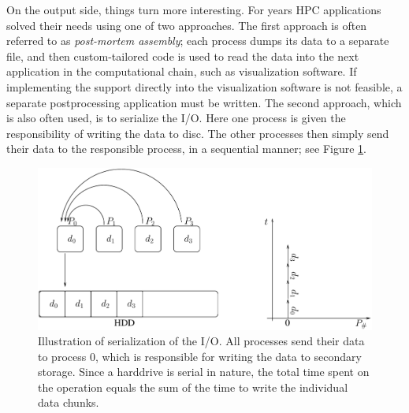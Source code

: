 \documentclass[twoside, 11pt, a4paper]{article}
\begin{document}
On the output side, things turn more interesting. For years HPC applications solved 
their needs using one of two approaches. The first approach is often referred to as
\emph{post-mortem assembly}; each process dumps its data to a separate file, and 
then custom-tailored code is used to read the data into the next application in the
computational chain, such as visualization software. If implementing the support directly
into the visualization software is not feasible, a separate postprocessing 
application must be written. The second approach, which is also often used, is to 
serialize the I/O. Here one process is given the responsibility of writing the data 
to disc. The other processes then simply send their data to the responsible process, 
in a sequential manner; see Figure \ref{fig:serial}.

\begin{figure}[ht]
	\begin{center}
		\includegraphics[width=12cm]{serial}
	\end{center}
	\caption{Illustration of serialization of the I/O. All processes send their
			 data to process 0, which is responsible for writing the data to secondary
			 storage. Since a harddrive is serial in nature, the total time spent
			 on the operation equals the sum of the time to write the individual data
			 chunks.}
	\label{fig:serial}
\end{figure}
\end{document}
